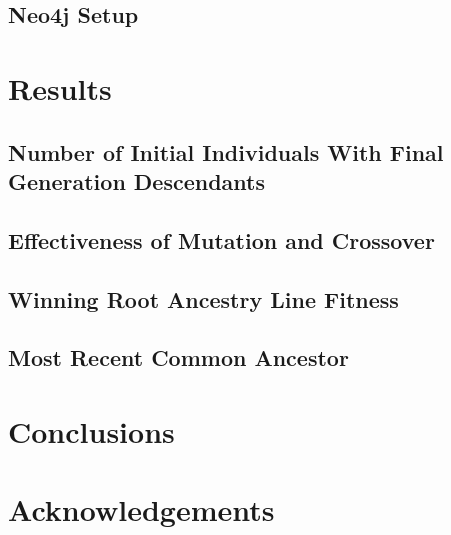 \documentclass[12pt]{article}
\begin{document}
\subsection{Neo4j Setup} \label{Neo4j Setup}

\section{Results} \label{Results}

\subsection{Number of Initial Individuals With Final Generation Descendants} \label{Number Initial Individuals With Descendants}

\subsection{Effectiveness of Mutation and Crossover} \label{Effectiveness Mutation Crossover}

\subsection{Winning Root Ancestry Line Fitness} \label{Winning Root Line Fitness}

\subsection{Most Recent Common Ancestor} \label{Most Recent Common Ancestor}

\section{Conclusions} \label{Conclusions}

\section*{Acknowledgements}

\pagebreak



\end{document}

